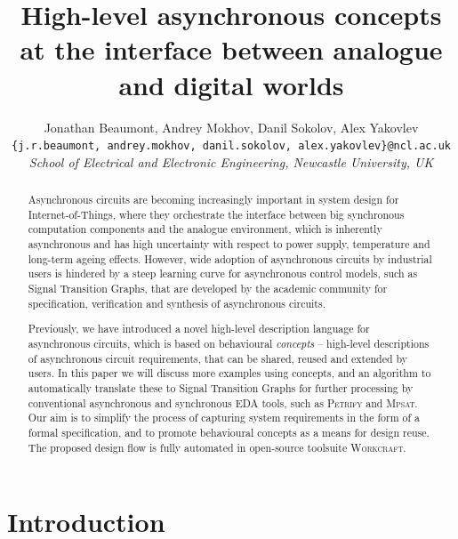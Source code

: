 \documentclass[british, journal]{IEEEtran}
\newcommand{\noun}[1]{\textsc{#1}}
\begin{document}
\twocolumn

\title{High-level asynchronous concepts at the interface between analogue and
digital worlds}
\author{Jonathan Beaumont, Andrey Mokhov, Danil Sokolov, Alex Yakovlev\\
\texttt{\{j.r.beaumont, andrey.mokhov, danil.sokolov,
alex.yakovlev\}@ncl.ac.uk}\\
\emph{School of Electrical and Electronic Engineering, Newcastle University,
UK}}

\maketitle

\begin{abstract}
Asynchronous circuits are becoming increasingly important in
system design for Internet-of-Things, where they orchestrate
the interface between big synchronous computation components
and the analogue environment, which is inherently asynchronous
and has high uncertainty with respect to power supply,
temperature and long-term ageing effects.
However, wide adoption of asynchronous circuits by industrial users is
hindered by a steep learning curve for asynchronous control models,
such as Signal Transition Graphs, that are developed by the academic
community for specification, verification and synthesis of
asynchronous circuits.

Previously, we have introduced a novel high-level description language
for asynchronous circuits, which is based on behavioural
\textit{concepts} -- high-level descriptions of asynchronous circuit
requirements, that can be shared, reused and extended by users. 
In this paper we will discuss more examples using concepts, and an algorithm to
automatically translate these to Signal Transition Graphs for further processing
by conventional asynchronous and synchronous EDA tools, such as \noun{Petrify}
and \noun{Mpsat}. Our aim is to simplify the process of capturing system
requirements in the form of a formal specification, and to promote behavioural
concepts as a means for design reuse. The proposed design flow is fully
automated in open-source toolsuite \noun{Workcraft}.
\end{abstract}

\sloppy
\thispagestyle{empty}

\section{Introduction}
\end{document}
